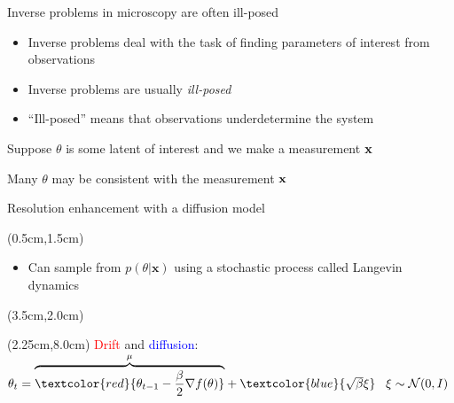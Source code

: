 \documentclass{beamer}					%
\begin{document}
\begin{frame}{Inverse problems in microscopy are often ill-posed}

\begin{itemize}
\item Inverse problems deal with the task of finding parameters of interest from observations
\item Inverse problems are usually \emph{ill-posed}
\item ``Ill-posed'' means that observations underdetermine the system
\end{itemize}

\vspace{0.2in}
Suppose $\theta$ is some latent of interest and we make a measurement $\bold{x}$

\vspace{0.2in}
Many $\theta$ may be consistent with the measurement $\bold{x}$

\end{frame}

\begin{frame}{Resolution enhancement with a diffusion model}
\begin{textblock*}{13cm}(0.5cm,1.5cm)
\begin{itemize}
\item Can sample from $p(\theta\lvert \boldsymbol{x})$ using a stochastic process called Langevin dynamics
\end{itemize}
\end{textblock*}
\begin{textblock*}{8cm}(3.5cm,2.0cm)
\end{textblock*}
\begin{textblock*}{14cm}(2.25cm,8.0cm)
\textcolor{red}{Drift} and \textcolor{blue}{diffusion}: 
$\theta_{t} = 
\overset{\mu}{\overbrace{\textcolor{red}{\theta_{t-1} - \frac{\beta}{2}\nabla f(\theta)}}} 
+ \textcolor{blue}{\sqrt{\beta}\xi} 
\;\;\; \xi \sim \mathcal{N}(0,I)$
\end{textblock*}
\end{frame}

\end{document}
